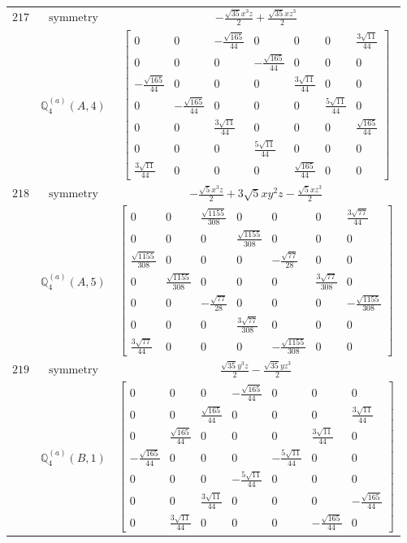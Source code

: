 \documentclass[fleqn,8pt,landscape]{jsarticle}
\begin{document}
\begin{longtable}{ccc}
$ 217 $ & $ \text{symmetry} $ & $ - \frac{\sqrt{35} x^{3} z}{2} + \frac{\sqrt{35} x z^{3}}{2} $ \\
$  $ & $ \mathbb{Q}_{4}^{(a)}(A,4) $ & $ \begin{bmatrix} 0 & 0 & - \frac{\sqrt{165}}{44} & 0 & 0 & 0 & \frac{3 \sqrt{11}}{44} \\ 0 & 0 & 0 & - \frac{\sqrt{165}}{44} & 0 & 0 & 0 \\ - \frac{\sqrt{165}}{44} & 0 & 0 & 0 & \frac{3 \sqrt{11}}{44} & 0 & 0 \\ 0 & - \frac{\sqrt{165}}{44} & 0 & 0 & 0 & \frac{5 \sqrt{11}}{44} & 0 \\ 0 & 0 & \frac{3 \sqrt{11}}{44} & 0 & 0 & 0 & \frac{\sqrt{165}}{44} \\ 0 & 0 & 0 & \frac{5 \sqrt{11}}{44} & 0 & 0 & 0 \\ \frac{3 \sqrt{11}}{44} & 0 & 0 & 0 & \frac{\sqrt{165}}{44} & 0 & 0 \end{bmatrix} $ \\ \hline
$ 218 $ & $ \text{symmetry} $ & $ - \frac{\sqrt{5} x^{3} z}{2} + 3 \sqrt{5} x y^{2} z - \frac{\sqrt{5} x z^{3}}{2} $ \\
$  $ & $ \mathbb{Q}_{4}^{(a)}(A,5) $ & $ \begin{bmatrix} 0 & 0 & \frac{\sqrt{1155}}{308} & 0 & 0 & 0 & \frac{3 \sqrt{77}}{44} \\ 0 & 0 & 0 & \frac{\sqrt{1155}}{308} & 0 & 0 & 0 \\ \frac{\sqrt{1155}}{308} & 0 & 0 & 0 & - \frac{\sqrt{77}}{28} & 0 & 0 \\ 0 & \frac{\sqrt{1155}}{308} & 0 & 0 & 0 & \frac{3 \sqrt{77}}{308} & 0 \\ 0 & 0 & - \frac{\sqrt{77}}{28} & 0 & 0 & 0 & - \frac{\sqrt{1155}}{308} \\ 0 & 0 & 0 & \frac{3 \sqrt{77}}{308} & 0 & 0 & 0 \\ \frac{3 \sqrt{77}}{44} & 0 & 0 & 0 & - \frac{\sqrt{1155}}{308} & 0 & 0 \end{bmatrix} $ \\ \hline
$ 219 $ & $ \text{symmetry} $ & $ \frac{\sqrt{35} y^{3} z}{2} - \frac{\sqrt{35} y z^{3}}{2} $ \\
$  $ & $ \mathbb{Q}_{4}^{(a)}(B,1) $ & $ \begin{bmatrix} 0 & 0 & 0 & - \frac{\sqrt{165}}{44} & 0 & 0 & 0 \\ 0 & 0 & \frac{\sqrt{165}}{44} & 0 & 0 & 0 & \frac{3 \sqrt{11}}{44} \\ 0 & \frac{\sqrt{165}}{44} & 0 & 0 & 0 & \frac{3 \sqrt{11}}{44} & 0 \\ - \frac{\sqrt{165}}{44} & 0 & 0 & 0 & - \frac{5 \sqrt{11}}{44} & 0 & 0 \\ 0 & 0 & 0 & - \frac{5 \sqrt{11}}{44} & 0 & 0 & 0 \\ 0 & 0 & \frac{3 \sqrt{11}}{44} & 0 & 0 & 0 & - \frac{\sqrt{165}}{44} \\ 0 & \frac{3 \sqrt{11}}{44} & 0 & 0 & 0 & - \frac{\sqrt{165}}{44} & 0 \end{bmatrix} $ \\ \hline

\end{longtable}
\end{document}
